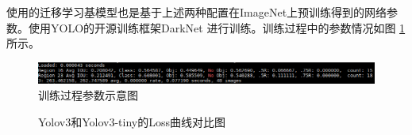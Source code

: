 使用的迁移学习基模型也是基于上述两种配置在ImageNet上预训练得到的网络参数。使用YOLO的开源训练框架DarkNet \cite{DarkNet}
进行训练。训练过程中的参数情况如图 \ref{fig:train:log} 所示。
\begin{figure}[h]
    \centering
    \includegraphics[width=\textwidth]{pic/chap3/train_log.png}
    \caption{训练过程参数示意图}
    \label{fig:train:log}
\end{figure}

\begin{figure}[t]
    \centering
    \caption{Yolov3和Yolov3-tiny的Loss曲线对比图}
    \label{fig:Loss}
\end{figure}

